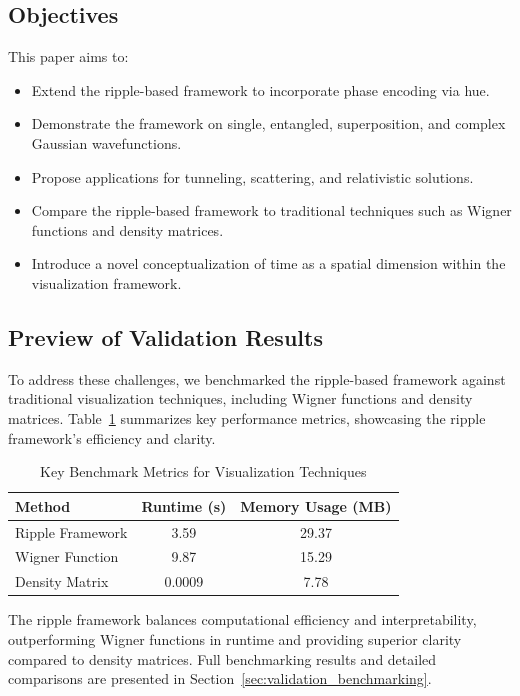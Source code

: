 \documentclass[12pt]{article}
\begin{document}
\subsection{Objectives}
This paper aims to:
\begin{itemize}
    \item Extend the ripple-based framework to incorporate phase encoding via hue.
    \item Demonstrate the framework on single, entangled, superposition, and complex Gaussian wavefunctions.
    \item Propose applications for tunneling, scattering, and relativistic solutions.
    \item Compare the ripple-based framework to traditional techniques such as Wigner functions and density matrices.
    \item Introduce a novel conceptualization of time as a spatial dimension within the visualization framework.
\end{itemize}

\subsection{Preview of Validation Results}
To address these challenges, we benchmarked the ripple-based framework against traditional visualization techniques, including Wigner functions and density matrices. Table~\ref{tab:preview_results} summarizes key performance metrics, showcasing the ripple framework's efficiency and clarity.

\begin{table}[H]
\centering
\caption{Key Benchmark Metrics for Visualization Techniques}
\begin{tabular}{|l|c|c|}
    \hline
    \textbf{Method} & \textbf{Runtime (s)} & \textbf{Memory Usage (MB)} \\
    \hline
    Ripple Framework    & 3.59        & 29.37             \\
    Wigner Function     & 9.87        & 15.29             \\
    Density Matrix      & 0.0009      & 7.78              \\
    \hline
\end{tabular}
\label{tab:preview_results}
\end{table}

The ripple framework balances computational efficiency and interpretability, outperforming Wigner functions in runtime and providing superior clarity compared to density matrices. Full benchmarking results and detailed comparisons are presented in Section~\ref{sec:validation_benchmarking}.
\end{document}

